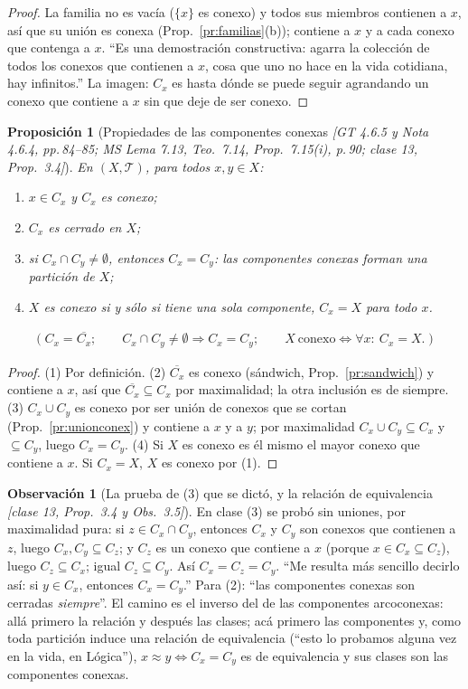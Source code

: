 \documentclass[11pt,a4paper]{article}
\newcommand{\lgc}[1]{\par\vspace{-3pt}\begin{gather*}\big(\;#1\;\big)\end{gather*}\vspace{-6pt}}
\theoremstyle{definition}
\newtheorem{observacion}[definicion]{Observación}
\theoremstyle{plain}
\newtheorem{proposicion}[definicion]{Proposición}
\newcommand{\fnt}[1]{{\normalfont\small\itshape\color{gray!150!black}[#1]}}
\newcommand{\cl}[1]{\overline{#1}}
\newcommand{\tp}{\mathcal{T}}
\begin{document}
\begin{proof}
La familia no es vacía ($\{x\}$ es conexo) y todos sus miembros contienen a $x$, así que su unión es conexa (Prop.~\ref{pr:familias}(b)); contiene a $x$ y a cada conexo que contenga a $x$. ``Es una demostración constructiva: agarra la colección de todos los conexos que contienen a $x$, cosa que uno no hace en la vida cotidiana, hay infinitos.'' La imagen: $C_x$ es hasta dónde se puede seguir agrandando un conexo que contiene a $x$ sin que deje de ser conexo.
\end{proof}

\begin{proposicion}[Propiedades de las componentes conexas \fnt{GT 4.6.5 y Nota 4.6.4, pp.\,84--85; MS Lema 7.13, Teo.\ 7.14, Prop.\ 7.15(i), p.\,90; clase 13, Prop.\ 3.4}]\label{cc:propcomp}
En $(X,\tp)$, para todos $x,y\in X$:
\begin{enumerate}[label=(\arabic*),leftmargin=2.2em,itemsep=0pt]
\item $x\in C_x$ y $C_x$ es conexo;
\item $C_x$ es \emph{cerrado} en $X$;
\item si $C_x\cap C_y\ne\emptyset$, entonces $C_x=C_y$: las componentes conexas forman una partición de $X$;
\item $X$ es conexo si y sólo si tiene una sola componente, $C_x=X$ para todo $x$.
\end{enumerate}
\lgc{C_x=\cl{C_x};\qquad C_x\cap C_y\ne\emptyset\Rightarrow C_x=C_y;\qquad X\ \text{conexo}\iff\forall x:\ C_x=X.}
\end{proposicion}

\begin{proof}
(1) Por definición. (2) $\cl{C_x}$ es conexo (sándwich, Prop.~\ref{pr:sandwich}) y contiene a $x$, así que $\cl{C_x}\subseteq C_x$ por maximalidad; la otra inclusión es de siempre. (3) $C_x\cup C_y$ es conexo por ser unión de conexos que se cortan (Prop.~\ref{pr:unionconex}) y contiene a $x$ y a $y$; por maximalidad $C_x\cup C_y\subseteq C_x$ y $\subseteq C_y$, luego $C_x=C_y$. (4) Si $X$ es conexo es él mismo el mayor conexo que contiene a $x$. Si $C_x=X$, $X$ es conexo por (1).
\end{proof}

\begin{observacion}[La prueba de (3) que se dictó, y la relación de equivalencia \fnt{clase 13, Prop.\ 3.4 y Obs.\ 3.5}]
En clase (3) se probó sin uniones, por maximalidad pura: si $z\in C_x\cap C_y$, entonces $C_x$ y $C_y$ son conexos que contienen a $z$, luego $C_x,C_y\subseteq C_z$; y $C_z$ es un conexo que contiene a $x$ (porque $x\in C_x\subseteq C_z$), luego $C_z\subseteq C_x$; igual $C_z\subseteq C_y$. Así $C_x=C_z=C_y$. ``Me resulta más sencillo decirlo así: si $y\in C_x$, entonces $C_x=C_y$.'' Para (2): ``las componentes conexas son cerradas \emph{siempre}''.
El camino es el inverso del de las componentes arcoconexas: allá primero la relación y después las clases; acá primero las componentes y, como toda partición induce una relación de equivalencia (``esto lo probamos alguna vez en la vida, en Lógica''), $x\approx y\iff C_x=C_y$ es de equivalencia y sus clases son las componentes conexas.
\end{observacion}
\end{document}
